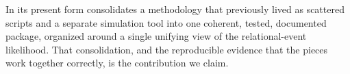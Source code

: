 In its present form  consolidates a methodology that previously lived
as scattered scripts and a separate simulation tool into one coherent, tested,
documented package, organized around a single unifying view of the
relational-event likelihood. That consolidation, and the reproducible evidence
that the pieces work together correctly, is the contribution we claim.
